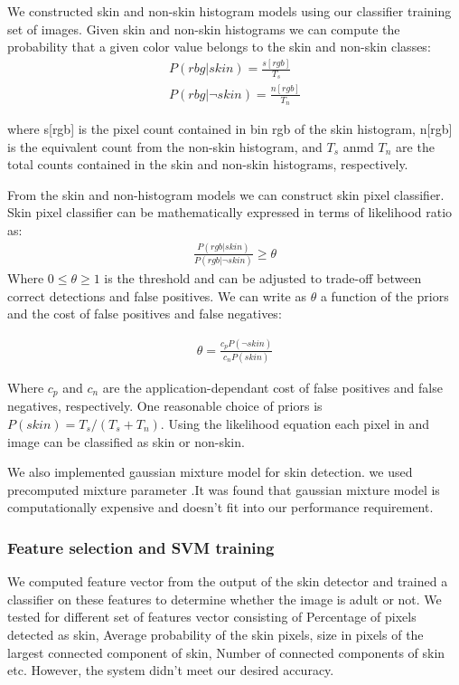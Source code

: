 We constructed skin and non-skin histogram models using our classiﬁer training set of images.  Given skin and non-skin histograms we can compute the probability that a given color value belongs to the skin and non-skin classes:
\begin{align}
P(rbg|skin)=\frac{s[rgb]}{T_{s}} \\
P(rbg|\neg skin)=\frac{n[rgb]}{T_{n}}
\end{align}

where s[rgb] is the pixel count contained in bin rgb of the skin histogram, n[rgb]  is the equivalent count from the non-skin histogram, and ${T_{s}}$ anmd ${T_{n}}$ are the total counts contained in the skin and non-skin histograms, respectively.

From the skin and non-histogram models we can construct skin pixel classifier. Skin pixel classifier can be mathematically expressed in terms of likelihood ratio as:
\begin{align}
            \frac{P(rgb|skin)}{ P(rgb|\neg skin)}\ge\theta
\end{align}
Where $ 0\le\theta\ge1 $ is the threshold and can be adjusted to trade-off between correct detections and false positives. We can write  as $\theta$ a function of the priors and the cost of false positives and false negatives:


\begin{align}
\theta=\frac{c_{p}P(\neg skin)}{ c_{n}P(skin)}
\end{align}
     
Where ${c_{p}}$ and ${c_{n}}$ are the application-dependant cost of false positives and false negatives, respectively. One reasonable choice of priors is $P(skin)= {T_{s}}/({T_{s}}+{T_{n}})$.
Using the likelihood equation each pixel in and image can be classified as skin or non-skin.
\par
We also implemented gaussian mixture model for skin detection. we used precomputed mixture parameter \cite{citeulike:2260219}.It was found that gaussian mixture model is computationally expensive and doesn't fit into our performance requirement. 
 
\subsubsection{Feature selection and SVM training}
            We computed feature vector from the output of the skin detector and trained a classifier on these features to determine whether the image is adult or not. We tested for different set of features vector consisting of Percentage of pixels detected as skin, Average probability of the skin pixels, size in pixels of the largest connected component of skin, Number of connected components of skin etc. However, the system didn’t meet our desired accuracy.







